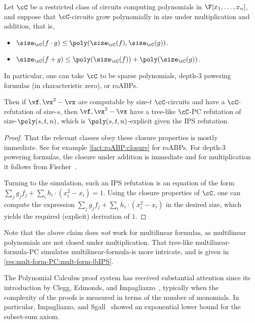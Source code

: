 \documentclass{toc}
\begin{document}
\begin{lemma}\label{res:ips-vs-pc}
        Let $\cC$ be a restricted class of circuits computing polynomials in $\F[x_1,\ldots,x_n]$, and suppose that $\cC$-circuits grow polynomially in size under multiplication and addition, that is,
        \begin{itemize}
                \item $\size_\cC(f\cdot g)\le \poly(\size_\cC(f),\size_\cC(g))$.
                \item $\size_\cC(f+g)\le \poly(\size_\cC(f))+\poly(\size_\cC(g))$.
        \end{itemize}
        In particular, one can take $\cC$ to be sparse polynomials, depth-3 powering formulas (in characteristic zero), or roABPs.

        Then if $\vf,\vx^2-\vx$ are computable by size-$t$ $\cC$-circuits and have a $\cC$-\lIPS refutation of size-$s$, then $\vf,\vx^2-\vx$ have a tree-like $\cC$-PC refutation of size-$\poly(s,t,n)$, which is $\poly(s,t,n)$-explicit given the IPS refutation.
\end{lemma}
\begin{proof}
        That the relevant classes obey these closure properties is mostly immediate. See for example \autoref{fact:roABP:closure} for roABPs.  For depth-3 powering formulas, the closure under addition is immediate and for multiplication it follows from Fischer~\cite{Fischer94}.

        Turning to the simulation, such an IPS refutation is an equation of the form $\sum_j g_jf_j+\sum_i h_i\cdot (x_i^2-x_i)=1$. Using the closure properties of $\cC$, one can compute the expression $\sum_j g_jf_j+\sum_i h_i\cdot (x_i^2-x_i)$ in the desired size, which yields the required (explicit) derivation of $1$.
\end{proof}

Note that the above claim does \emph{not} work for multilinear formulas, as multilinear polynomials are not closed under multiplication.  That tree-like multilinear-formula-PC simulates multilinear-formula-\lIPS is more intricate, and is given in \autoref{res:mult-form-PC:mult-form-lbIPS}.

The Polynomial Calculus proof system has received substantial attention since its introduction by Clegg, Edmonds, and Impagliazzo~\cite{CleggEI96}, typically when the complexity of the proofs is measured in terms of the number of monomials. In particular, Impagliazzo, \Pudlak and Sgall~\cite{IPS99} showed an exponential lower bound for the subset-sum axiom.
\end{document}
